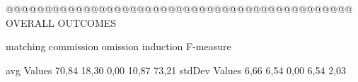  @@@@@@@@@@@@@@@@@@@@@@@@@@@@@@@@@@@@@@@@@@@@@ OVERALL OUTCOMES

                matching commission   omission  induction  F-measure
      
avg Values      70,84      18,30       0,00      10,87    73,21      
stdDev Values    6,66       6,54       0,00       6,54     2,03       

